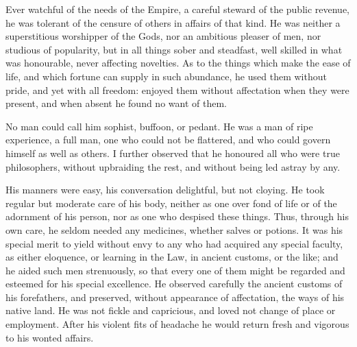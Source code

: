 \documentclass{book}
\begin{document}
Ever watchful of the needs of the Empire, a careful steward of the
public revenue, he was tolerant of the censure of others in affairs of
that kind. He was neither a superstitious worshipper of the Gods, nor
an ambitious pleaser of men, nor studious of popularity, but in all
things sober and steadfast, well skilled in what was honourable, never
affecting novelties. As to the things which make the ease of life, and
which fortune can supply in such abundance, he used them without pride,
and yet with all freedom: enjoyed them without affectation when they
were present, and when absent he found no want of them.

No man could call him sophist, buffoon, or pedant. He was a man of ripe
experience, a full man, one who could not be flattered, and who could
govern himself as well as others. I further observed that he honoured
all who were true philosophers, without upbraiding the rest, and without
being led astray by any.

His manners were easy, his conversation delightful, but not cloying. He
took regular but moderate care of his body, neither as one over fond of
life or of the adornment of his person, nor as one who despised these
things. Thus, through his own care, he seldom needed any medicines,
whether salves or potions. It was his special merit to yield without
envy to any who had acquired any special faculty, as either eloquence,
or learning in the Law, in ancient customs, or the like; and he aided
such men strenuously, so that every one of them might be regarded
and esteemed for his special excellence. He observed carefully the
ancient customs of his forefathers, and preserved, without appearance
of affectation, the ways of his native land. He was not fickle and
capricious, and loved not change of place or employment. After his
violent fits of headache he would return fresh and vigorous to his
wonted affairs.
\end{document}
